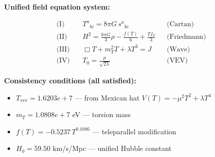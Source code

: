 
\textbf{Unified field equation system:}

\begin{align}
  \text{(I)} \quad & T^a{}_{bc} = 8\pi G \, s^a{}_{bc} && \text{(Cartan)} \\
  \text{(II)} \quad & H^2 = \frac{8\pi G}{3}\rho - \frac{f(T)}{6} + \frac{Tf_T}{3} && \text{(Friedmann)} \\
  \text{(III)} \quad & \Box T + m_T^2 T + \lambda T^3 = J && \text{(Wave)} \\
  \text{(IV)} \quad & T_0 = \frac{\mu}{\sqrt{2\lambda}} && \text{(VEV)}
\end{align}

\textbf{Consistency conditions (all satisfied):}
\begin{itemize}
  \item $T_{\text{vev}} = 1.6203e+7$ — from Mexican hat $V(T) = -\mu^2 T^2 + \lambda T^4$
  \item $m_T = 1.0808e+7$ eV — torsion mass
  \item $f(T) = -0.5237 \, T^{0.1086}$ — teleparallel modification
  \item $H_0 = 59.50$ km/s/Mpc — unified Hubble constant
\end{itemize}